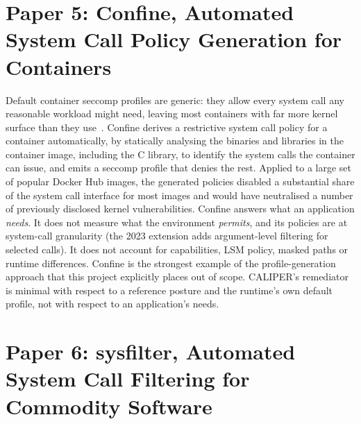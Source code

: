 \section{Paper 5: Confine, Automated System Call Policy Generation for Containers}
\label{lit:confine}

 Default container seccomp profiles are generic: they allow every system call any reasonable workload might need, leaving most containers with far more kernel surface than they use~\cite{confine,confine2023}.
 Confine derives a restrictive system call policy for a container automatically, by statically analysing the binaries and libraries in the container image, including the C library, to identify the system calls the container can issue, and emits a seccomp profile that denies the rest.
 Applied to a large set of popular Docker Hub images, the generated policies disabled a substantial share of the system call interface for most images and would have neutralised a number of previously disclosed kernel vulnerabilities.
 Confine answers what an application \emph{needs}. It does not measure what the environment \emph{permits}, and its policies are at system-call granularity (the 2023 extension adds argument-level filtering for selected calls). It does not account for capabilities, LSM policy, masked paths or runtime differences.
 Confine is the strongest example of the profile-generation approach that this project explicitly places out of scope. CALIPER's remediator is minimal with respect to a reference posture and the runtime's own default profile, not with respect to an application's needs.

\section{Paper 6: sysfilter, Automated System Call Filtering for Commodity Software}
\label{lit:sysfilter}

